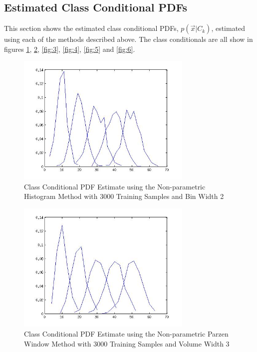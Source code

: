 \documentclass[journal]{IEEEtran}
\begin{document}
\subsection{Estimated Class Conditional PDFs}
\par This section shows the estimated class conditional PDFs, \(p(\vec{x}\vert C_k)\), estimated using each of the methods described above. The class conditionals are all show in figures \ref{fig:1}, \ref{fig:2}, \ref{fig:3}, \ref{fig:4}, \ref{fig:5} and \ref{fig:6}.
\begin{figure}[h]
\centering
\includegraphics[width=3.3in]{../images/conditional_using_histogram_binwidth2.jpg}
\caption{Class Conditional PDF Estimate using the Non-parametric Histogram Method with 3000 Training Samples and Bin Width 2}
\label{fig:1}
\end{figure}

\begin{figure}
\centering
\includegraphics[width=3.3in]{../images/conditional_using_parzen_h3.jpg}
\caption{Class Conditional PDF Estimate using the Non-parametric Parzen Window Method with 3000 Training Samples and Volume Width 3}
\label{fig:2}
\end{figure}
\end{document}
